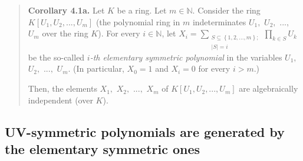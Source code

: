 \documentclass[numbers=enddot,12pt,final,onecolumn,notitlepage]{scrartcl}%
\begin{document}
\begin{quote}
\textbf{Corollary 4.1a.} Let $K$ be a ring. Let $m\in\mathbb{N}$. Consider the
ring $K\left[  U_{1},U_{2},...,U_{m}\right]  $ (the polynomial ring in $m$
indeterminates $U_{1},$ $U_{2},$ $...,$ $U_{m}$ over the ring $K$). For every
$i\in\mathbb{N}$, let $X_{i}=\sum\limits_{\substack{S\subseteq\left\{
1,2,...,m\right\}  ;\\\left\vert S\right\vert =i}}\prod\limits_{k\in S}U_{k}$
be the so-called $i$\textit{-th elementary symmetric polynomial} in the
variables $U_{1},$ $U_{2},$ $...,$ $U_{m}$. (In particular, $X_{0}=1$ and
$X_{i}=0$ for every $i>m$.)

Then, the elements $X_{1},$ $X_{2},$ $...,$ $X_{m}$ of $K\left[  U_{1}%
,U_{2},...,U_{m}\right]  $ are algebraically independent (over $K$).
\end{quote}

\subsection{UV-symmetric polynomials are generated by the elementary symmetric
ones}
\end{document}
